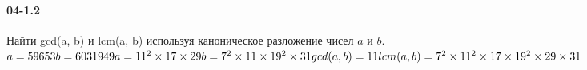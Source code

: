 \documentclass[12pt]{article}
\begin{document}
	\paragraph{04-1.2} Найти gcd(a, b) и lcm(a, b) используя каноническое разложение чисел $a$ и $b$.
	\\
	\ensuremath{
		a = 59653 \\
		b = 6031949 \\
		\\
		\\
		a = 11^{2} \times 17 \times 29 \\
		b = 7^{2} \times 11 \times 19^{2} \times 31 \\
		\\
		gcd(a, b) = 11 \\
		lcm(a, b) =  7^{2} \times 11^2 \times 17 \times 19^{2} \times 29 \times 31
	}
	\clearpage
\end{document}
